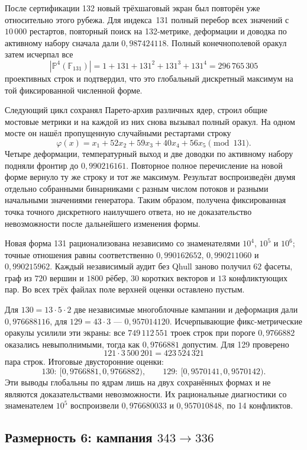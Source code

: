 После сертификации 132 новый трёхшаговый экран был повторён уже относительно
этого рубежа. Для индекса~131 полный перебор всех значений с $10\,000$ рестартов,
повторный поиск на 132-метрике, деформации и доводка по активному набору сначала дали
$0{,}987424118$. Полный конечнополевой оракул затем исчерпал все
\[
 |\mathbb P^4(\mathbb F_{131})|
 =1+131+131^2+131^3+131^4=296\,765\,305
\]
проективных строк и подтвердил, что это глобальный дискретный максимум на
той фиксированной численной форме.

Следующий цикл сохранял Парето-архив различных ядер, строил общие мостовые
метрики и на каждой из них снова вызывал полный оракул. На одном мосте он
нашёл пропущенную случайными рестартами строку
\[
 \varphi(x)=x_1+52x_2+59x_3+40x_4+56x_5\pmod {131}.
\]
Четыре деформации, температурный выход и две доводки по активному набору подняли
фронтир до $0{,}990216161$. Повторное полное перечисление на новой форме
вернуло ту же строку и тот же максимум. Результат воспроизведён двумя отдельно
собранными бинарниками с разным числом потоков и разными начальными значениями генератора. Таким образом, получена
фиксированная точка точного дискретного наилучшего ответа, но не доказательство
невозможности после дальнейшего изменения формы.

Новая форма 131 рационализована независимо со знаменателями $10^4$, $10^5$ и
$10^6$; точные отношения равны соответственно $0{,}990162652$,
$0{,}990211060$ и $0{,}990215962$. Каждый независимый аудит без Qhull заново
получил $62$ фасеты, граф из $720$ вершин и $1800$ рёбер, $30$ коротких
векторов и $13$ конфликтующих пар. Во всех трёх файлах поле верхней оценки оставлено пустым.

Для $130=13\cdot5\cdot2$ две независимые многоблочные кампании и деформация
дали $0{,}976688116$, для $129=43\cdot3$ --- $0{,}957014120$.
Исчерпывающие фикс-метрические оракулы усилили эти экраны: все
$749\,112\,551$ троек строк при пороге $0{,}9766882$ оказались невыполнимыми, тогда
как $0{,}9766881$ допустим. Для 129 проверено
\[
  121\cdot3\,500\,201=423\,524\,321
\]
пара строк. Итоговые двусторонние оценки:
\[
  130:\ [0{,}9766881,0{,}9766882),\qquad
  129:\ [0{,}9570141,0{,}9570142).
\]
Эти выводы глобальны по ядрам лишь на двух
сохранённых формах и не являются доказательствами невозможности. Их
рациональные диагностики со знаменателем $10^5$ воспроизвели
$0{,}976680033$ и $0{,}957010848$, по 14 конфликтов.

\subsection{Размерность 6: кампания $343\to336$}\label{app:d6}

